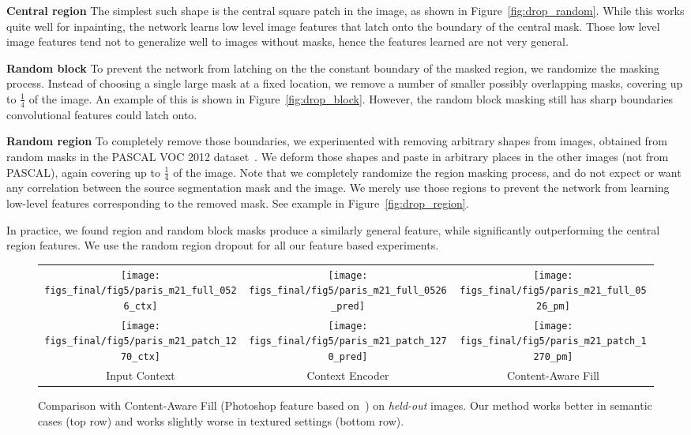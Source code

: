 \documentclass[10pt,twocolumn,letterpaper]{article}
\newcommand{\reffig}[1]{Figure~\ref{fig:#1}}
\newcommand{\lblfig}[1]{\label{fig:#1}}
\begin{document}
{\bf Central region} The simplest such shape is the central square patch in the image, as shown in \reffig{drop_random}.
While this works quite well for inpainting, the network learns low level image features that latch onto the boundary of the central mask.
Those low level image features tend not to generalize well to images without masks, hence the features learned are not very general.

{\bf Random block} To prevent the network from latching on the the constant boundary of the masked region, we randomize the masking process.
Instead of choosing a single large mask at a fixed location, we remove a number of smaller possibly overlapping masks, covering up to $\frac{1}{4}$ of the image.
An example of this is shown in \reffig{drop_block}.
However, the random block masking still has sharp boundaries convolutional features could latch onto.

{\bf Random region} To completely remove those boundaries, we experimented with removing arbitrary shapes from images, obtained from random masks in the PASCAL VOC 2012 dataset~\cite{everingham2014pascal}.
We deform those shapes and paste in arbitrary places in the other images (not from PASCAL), again covering up to $\frac{1}{4}$ of the image.
Note that we completely randomize the region masking process, and do not expect or want any correlation between the source segmentation mask and the image.
We merely use those regions to prevent the network from learning low-level features corresponding to the removed mask.
See example in \reffig{drop_region}.

In practice, we found region and random block masks produce a similarly general feature, while significantly outperforming the central region features.
We use the random region dropout for all our feature based experiments.

\begin{figure}[t]
\vspace{-0.5em}
\centering
\begin{tabular}{c@{\hskip 4pt}c@{\hskip 4pt}c}
\texttt{[image: figs\_final/fig5/paris\_m21\_full\_0526\_ctx]} &
\texttt{[image: figs\_final/fig5/paris\_m21\_full\_0526\_pred]} &
\texttt{[image: figs\_final/fig5/paris\_m21\_full\_0526\_pm]} \\
\texttt{[image: figs\_final/fig5/paris\_m21\_patch\_1270\_ctx]} &
\texttt{[image: figs\_final/fig5/paris\_m21\_patch\_1270\_pred]} &
\texttt{[image: figs\_final/fig5/paris\_m21\_patch\_1270\_pm]} \\
\small Input Context & \small  Context Encoder & \small  Content-Aware Fill
\end{tabular}
\vspace{-0.5em}
\caption{Comparison with Content-Aware Fill (Photoshop feature based on~\cite{barnes2009patchmatch}) on \textit{held-out} images. Our method works better in semantic cases (top row) and works slightly worse in textured settings (bottom row).}
\lblfig{bad_results}
\vspace{-0.5em}
\end{figure}
%
%
%
%
%
%
%
%
%
%
%
%
%
%
%
%
%
\end{document}
